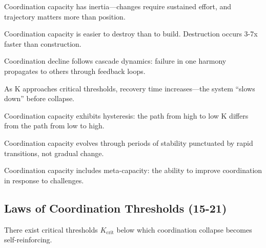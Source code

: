 \documentclass[12pt,letterpaper]{article}
\newcommand{\Kc}{K_{\text{crit}}}
\begin{document}
\begin{lawbox}
Coordination capacity has inertia---changes require sustained effort, and trajectory matters more than position.
\end{lawbox}

\begin{lawbox}
Coordination capacity is easier to destroy than to build. Destruction occurs 3-7x faster than construction.
\end{lawbox}

\begin{lawbox}
Coordination decline follows cascade dynamics: failure in one harmony propagates to others through feedback loops.
\end{lawbox}

\begin{lawbox}
As K approaches critical thresholds, recovery time increases---the system ``slows down'' before collapse.
\end{lawbox}

\begin{lawbox}
Coordination capacity exhibits hysteresis: the path from high to low K differs from the path from low to high.
\end{lawbox}

\begin{lawbox}
Coordination capacity evolves through periods of stability punctuated by rapid transitions, not gradual change.
\end{lawbox}

\begin{lawbox}
Coordination capacity includes meta-capacity: the ability to improve coordination in response to challenges.
\end{lawbox}

\subsection{Laws of Coordination Thresholds (15-21)}

\begin{lawbox}
There exist critical thresholds $\Kc$ below which coordination collapse becomes self-reinforcing.
\end{lawbox}
\end{document}
